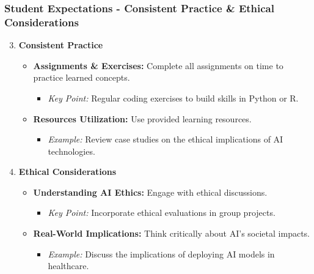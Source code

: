 \documentclass[aspectratio=169]{beamer}
\begin{document}
\begin{frame}[fragile]
    \frametitle{Student Expectations - Consistent Practice \& Ethical Considerations}
    \begin{enumerate}
        \setcounter{enumi}{2}  %
        \item \textbf{Consistent Practice}
        \begin{itemize}
            \item \textbf{Assignments \& Exercises:} Complete all assignments on time to practice learned concepts.
            \begin{itemize}
                \item \textit{Key Point:} Regular coding exercises to build skills in Python or R.
            \end{itemize}
            \item \textbf{Resources Utilization:} Use provided learning resources.
            \begin{itemize}
                \item \textit{Example:} Review case studies on the ethical implications of AI technologies.
            \end{itemize}
        \end{itemize}
        
        \item \textbf{Ethical Considerations}
        \begin{itemize}
            \item \textbf{Understanding AI Ethics:} Engage with ethical discussions.
            \begin{itemize}
                \item \textit{Key Point:} Incorporate ethical evaluations in group projects.
            \end{itemize}
            \item \textbf{Real-World Implications:} Think critically about AI's societal impacts.
            \begin{itemize}
                \item \textit{Example:} Discuss the implications of deploying AI models in healthcare.
            \end{itemize}
        \end{itemize}
    \end{enumerate}
\end{frame}
\end{document}
